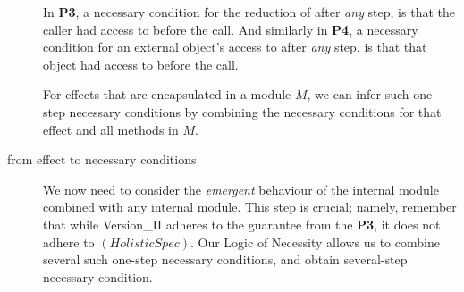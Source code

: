\begin{description}
In \textbf{P3},   a necessary condition for the  reduction of   after \emph{any}
step, is that the caller  had access to  before the call.
And similarly in \textbf{P4},   a necessary condition for an external object's
access to   after \emph{any}
step, is that that object had access to  before the call.

For effects that are encapsulated in a module $M$, we can infer such one-step
necessary conditions by combining the necessary conditions for that effect and 
all   methods in $M$.



\item[from effect to necessary conditions] 
We now need to consider the \emph{emergent} behaviour of the internal module
combined with any internal module. This step is crucial; namely, remember that while Version\_II adheres to
the guarantee from the \textbf{P3}, it does not adhere to  $(HolisticSpec)$.   
Our Logic of Necessity allows us to combine  several such one-step necessary conditions, and obtain  several-step   necessary condition.
 
\end{description} 
